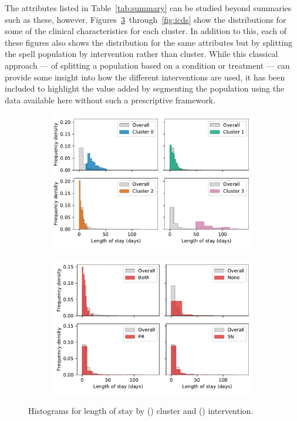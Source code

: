 \documentclass[11pt]{article}
\newlength{\imgwidth}
\begin{document}
The attributes listed in Table~\ref{tab:summary} can be studied beyond summaries
such as these, however. Figures~\ref{fig:los}~through~\ref{fig:icds} show
the distributions for some of the clinical characteristics for each cluster. In
addition to this, each of these figures also shows the distribution for the same
attributes but by splitting the spell population by intervention rather than
cluster. While this classical approach --- of splitting a population based on a
condition or treatment --- can provide some insight into how the different
interventions are used, it has been included to highlight the value added by
segmenting the population using the data available here without such a
prescriptive framework.

\begin{figure}
    \centering
    \begin{subfigure}{.5\imgwidth}
        \includegraphics[width=\linewidth]{img_cluster_true_los}
        \caption{}\label{fig:cluster_los}
    \end{subfigure}\hfill%
    \begin{subfigure}{.5\imgwidth}
        \includegraphics[width=\linewidth]{img_intervention_true_los}
        \caption{}\label{fig:intervention_los}
    \end{subfigure}
    \caption{%
        Histograms for length of stay by () cluster and
        () intervention.
    }\label{fig:los}
\end{figure}
\end{document}
